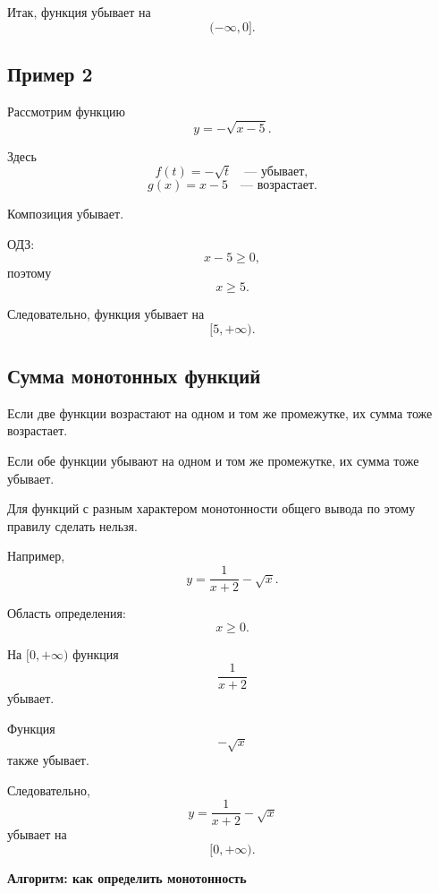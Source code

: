 \documentclass[a4paper,12pt]{article}
\newcommand{\subsect}[1]{\subsection*{\textcolor{accent}{#1}}}
\begin{document}
Итак, функция убывает на
\[
(-\infty,0].
\]

\subsect{Пример 2}

Рассмотрим функцию
\[
y=-\sqrt{x-5}.
\]

Здесь
\[
f(t)=-\sqrt{t}
\quad\text{--- убывает},
\]
\[
g(x)=x-5
\quad\text{--- возрастает}.
\]

Композиция убывает.

ОДЗ:
\[
x-5\ge0,
\]
поэтому
\[
x\ge5.
\]

Следовательно, функция убывает на
\[
[5,+\infty).
\]

\subsect{Сумма монотонных функций}

Если две функции возрастают на одном и том же промежутке, их сумма тоже возрастает.

Если обе функции убывают на одном и том же промежутке, их сумма тоже убывает.

Для функций с разным характером монотонности общего вывода по этому правилу сделать нельзя.

Например,
\[
y=\frac1{x+2}-\sqrt{x}.
\]

Область определения:
\[
x\ge0.
\]

На $[0,+\infty)$ функция
\[
\frac1{x+2}
\]
убывает.

Функция
\[
-\sqrt{x}
\]
также убывает.

Следовательно,
\[
y=\frac1{x+2}-\sqrt{x}
\]
убывает на
\[
[0,+\infty).
\]

\clearpage
\thispagestyle{fancy}

\begin{center}
{\Large\textcolor{darkaccent}{
\textbf{Алгоритм: как определить монотонность}
}}
\end{center}

\vspace{5mm}
\end{document}

